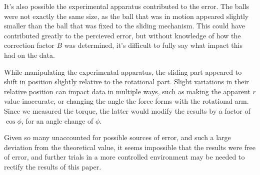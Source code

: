 \documentclass[11pt, letterpaper]{report}
\begin{document}
It's also possible the experimental apparatus contributed to the error. The balls were not exactly the same size, as the ball that was in motion appeared slightly smaller than the ball that was fixed to the sliding mechanism. This could have contributed greatly to the percieved error, but without knowledge of how the correction factor $B$ was determined, it's difficult to fully say what impact this had on the data.

While manipulating the experimental apparatus, the sliding part appeared to shift in position slightly relative to the rotational part. Slight variations in their relative position can impact data in multiple ways, such as making the apparent $r$ value inaccurate, or changing the angle the force forms with the rotational arm. Since we measured the torque, the latter would modify the results by a factor of $\cos \phi $, for an angle change of $\phi $.

Given so many unaccounted for possible sources of error, and such a large deviation from the theoretical value, it seems impossible that the results were free of error, and further trials in a more controlled environment may be needed to rectify the results of this paper.
\end{document}
